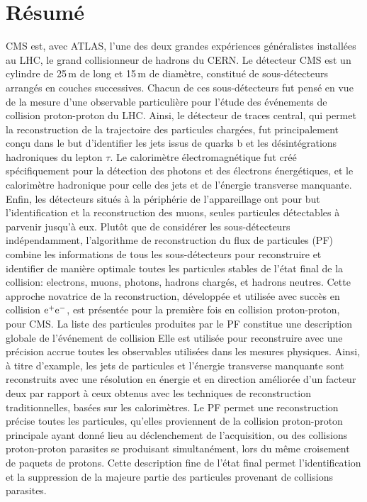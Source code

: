 \section*{Résumé}

CMS est, avec ATLAS, l'une des deux grandes expériences généralistes installées au LHC, le grand collisionneur de hadrons du CERN.
Le détecteur CMS est un cylindre de 25\,m de long et 15\,m de diamètre, constitué de sous-détecteurs arrangés en couches successives. 
Chacun de ces sous-détecteurs fut pensé en vue de la mesure d'une observable particulière pour l'étude des événements de collision proton-proton du LHC. 
Ainsi, le détecteur de traces central, qui permet la reconstruction de la trajectoire des particules chargées, fut principalement conçu dans le but d'identifier les jets issus de quarks b et les désintégrations hadroniques du lepton $\tau$. 
Le calorimètre électromagnétique fut créé spécifiquement pour la détection des photons et des électrons énergétiques, et le calorimètre hadronique pour celle des jets et de l'énergie transverse manquante. 
Enfin, les détecteurs situés à la périphérie de l'appareillage ont pour but l'identification et la reconstruction des muons, 
seules particules détectables à parvenir jusqu'à eux. 
Plutôt que de considérer les sous-détecteurs indépendamment, l'algorithme de reconstruction du flux de particules (PF) combine les informations de tous les sous-détecteurs pour reconstruire et identifier de manière optimale toutes les particules stables de l'état final de la collision: electrons, muons, photons, hadrons chargés, et hadrons neutres. 
Cette approche novatrice de la reconstruction, développée et utilisée avec succès en collision $\rm e^+e^-$, 
est présentée pour la première fois en collision proton-proton, pour CMS.  
La liste des particules produites par le PF constitue une description globale de l'événement de collision Elle est utilisée pour reconstruire avec une précision accrue toutes les observables utilisées dans les mesures physiques. 
Ainsi, à titre d'example, les jets de particules et l'énergie transverse manquante sont reconstruits avec une résolution en énergie et en direction améliorée d'un facteur deux par rapport à ceux obtenus avec les techniques de reconstruction traditionnelles, basées sur les calorimètres. 
Le PF permet une reconstruction précise toutes les particules, qu'elles proviennent de la collision proton-proton principale ayant donné lieu au déclenchement de l'acquisition, ou des collisions proton-proton parasites se produisant simultanément, lors du même croisement de paquets de protons. 
Cette description fine de l'état final permet l'identification et la suppression de la majeure partie des particules provenant de collisions parasites. 

